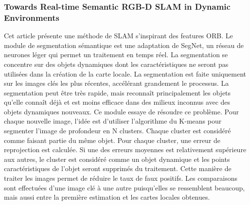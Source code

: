 \documentclass[11pt]{article}
\begin{document}
        \subsubsection{Towards Real-time Semantic RGB-D SLAM in Dynamic Environments} 
          Cet article \cite{jiRealtimeSemanticRGBD2021} présente une méthode de SLAM s'inspirant des features ORB.
          Le module de segmentation sémantique est une adaptation de SegNet, un réseau de neurones léger qui permet un traitement en temps réel.
          La segmentation se concentre sur des objets dynamiques dont les caractéristiques ne seront pas utilisées dans la création de 
          la carte locale. La segmentation est faite uniquement sur les images clés les plus récentes, accélérant grandement le processus.
          La segmentation peut être très rapide, mais reconnaît principalement les objets qu'elle connaît déjà et est moins efficace dans des 
          milieux inconnus avec des objets dynamiques nouveaux. Ce module essaye de résoudre ce problème.
          Pour chaque nouvelle image, l'idée est d'utiliser l'algorithme du K-means pour segmenter l'image de profondeur en N clusters.
          Chaque cluster est considéré comme faisant partie du même objet. Pour chaque cluster, une erreur de reprojection est calculée. Si une 
          des erreurs moyennes est relativement supérieure aux autres, le cluster est considéré comme un objet dynamique et les points caractéristiques
          de l'objet seront supprimés du traitement. Cette manière de traiter les images permet de réduire le taux de faux positifs. 
          Les comparaisons sont effectuées d'une image clé à une autre puisqu'elles se ressemblent beaucoup, mais aussi entre la première estimation
          et les cartes locales obtenues.        
\end{document}
